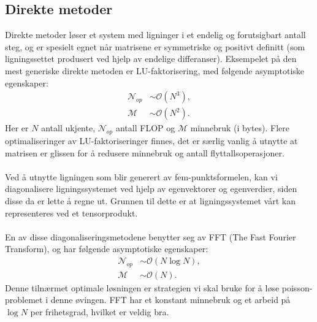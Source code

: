 \documentclass{article}
\begin{document}
\subsection{Direkte metoder}
Direkte metoder løser et system med ligninger i et endelig og forutsigbart antall steg, og er spesielt egnet når matrisene er symmetriske og positivt definitt (som ligningssettet produsert ved hjelp av endelige differanser). Eksempelet på den mest generiske direkte metoden er LU-faktorisering, med følgende asymptotiske egenskaper:
\begin{align*}
      \mathcal{N}_{op} &\sim \mathcal{O}(N^3), \\
      \mathcal{M} &\sim \mathcal{O}(N^2).
\end{align*}
Her er $N$ antall ukjente,  $\mathcal{N}_{op}$ antall FLOP og $\mathcal{M}$ minnebruk (i bytes). Flere optimaliseringer av LU-faktoriseringer finnes, det er særlig vanlig å utnytte at matrisen er glissen for å redusere minnebruk og antall flyttallsoperasjoner. \\
\\
Ved å utnytte ligningen som blir generert av fem-punktsformelen, kan vi diagonalisere ligningssystemet ved hjelp av egenvektorer og egenverdier, siden disse da er lette å regne ut. Grunnen til dette er at ligningssystemet vårt kan representeres ved et tensorprodukt.\\
\\
En av disse diagonaliseringsmetodene benytter seg av FFT (The Fast Fourier Transform), og har følgende asymptotiske egenskaper:
\begin{align*}
  \mathcal{N}_{op} &\sim \mathcal{O}(N \log N), \\
  \mathcal{M} &\sim \mathcal{O}(N).
\end{align*}
Denne tilnærmet optimale løsningen er strategien vi skal bruke for å løse poisson-problemet i denne øvingen. FFT har et konstant minnebruk og et arbeid på $\log N$ per frihetsgrad, hvilket er veldig bra.
\end{document}
